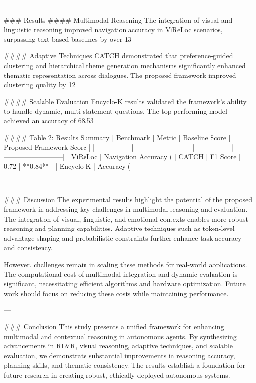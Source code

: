 ---

### Results
#### Multimodal Reasoning
The integration of visual and linguistic reasoning improved navigation accuracy in ViReLoc scenarios, surpassing text-based baselines by over 13%

#### Adaptive Techniques
CATCH demonstrated that preference-guided clustering and hierarchical theme generation mechanisms significantly enhanced thematic representation across dialogues. The proposed framework improved clustering quality by 12%

#### Scalable Evaluation
Encyclo-K results validated the framework's ability to handle dynamic, multi-statement questions. The top-performing model achieved an accuracy of 68.53%

#### Table 2: Results Summary
| Benchmark      | Metric                  | Baseline Score | Proposed Framework Score |
|----------------|--------------------------|----------------|--------------------------|
| ViReLoc        | Navigation Accuracy (%
| CATCH          | F1 Score                | 0.72           | **0.84**                 |
| Encyclo-K      | Accuracy (%

---

### Discussion
The experimental results highlight the potential of the proposed framework in addressing key challenges in multimodal reasoning and evaluation. The integration of visual, linguistic, and emotional contexts enables more robust reasoning and planning capabilities. Adaptive techniques such as token-level advantage shaping and probabilistic constraints further enhance task accuracy and consistency.

However, challenges remain in scaling these methods for real-world applications. The computational cost of multimodal integration and dynamic evaluation is significant, necessitating efficient algorithms and hardware optimization. Future work should focus on reducing these costs while maintaining performance.

---

### Conclusion
This study presents a unified framework for enhancing multimodal and contextual reasoning in autonomous agents. By synthesizing advancements in RLVR, visual reasoning, adaptive techniques, and scalable evaluation, we demonstrate substantial improvements in reasoning accuracy, planning skills, and thematic consistency. The results establish a foundation for future research in creating robust, ethically deployed autonomous systems.

